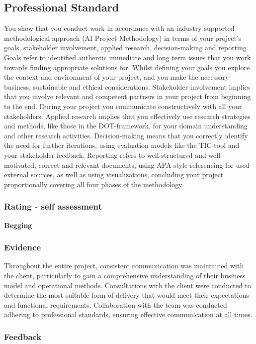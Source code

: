 \documentclass[a4paper, 11pt]{article}
\begin{document}
\subsection{Professional Standard}
You show that you conduct work in accordance with an industry supported methodological approach (AI Project Methodology) in terms of your project's goals, stakeholder involvement, applied research, decision-making and reporting.
\medbreak
Goals refer to identified authentic immediate and long term issues that you work towards finding appropriate solutions for. Whilst defining your goals you explore the context and environment of your project, and you make the necessary business, sustainable and ethical considerations. Stakeholder involvement implies that you involve relevant and competent partners in your project from beginning to the end. During your project you communicate constructively with all your stakeholders. Applied research implies that you effectively use research strategies and methods, like those in the DOT-framework, for your domain understanding and other research activities. Decision-making means that you correctly identify the need for further iterations, using evaluation models like the TIC-tool and your stakeholder feedback. Reporting refers to well-structured and well motivated, correct and relevant documents, using APA style referencing for used external sources, as well as using visualizations, concluding your project proportionally covering all four phases of the methodology.  

\subsubsection{Rating - self assessment}
\textbf{Begging} 
\subsubsection{Evidence} 
Throughout the entire project, consistent communication was maintained with the client, particularly to gain a comprehensive understanding of their business model and operational methods. Consultations with the client were conducted to determine the most suitable form of delivery that would meet their expectations and functional requirements. Collaboration with the team was conducted adhering to professional standards, ensuring effective communication at all times.

\pagebreak

\subsubsection{Feedback}
\end{document}
